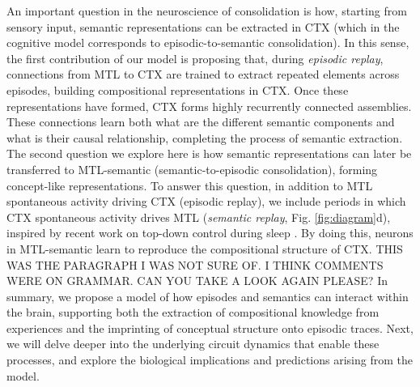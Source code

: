 \documentclass{article}
\begin{document}
\newline\newline
An important question in the neuroscience of consolidation is how, starting from sensory input, semantic representations can be extracted in CTX (which in the cognitive model corresponds to episodic-to-semantic consolidation). In this sense, the first contribution of our model is proposing that, during \textit{episodic replay}, connections from MTL to CTX are trained to extract repeated elements across episodes, building compositional representations in CTX. Once these representations have formed, CTX forms highly recurrently connected assemblies. These connections learn both what are the different semantic components and what is their causal relationship, completing the process of semantic extraction.
\newline\newline
The second question we explore here is how semantic representations can later be transferred to MTL-semantic (semantic-to-episodic consolidation), forming concept-like representations. To answer this question, in addition to MTL spontaneous activity driving CTX (episodic replay), we include periods in which CTX spontaneous activity drives MTL (\textit{semantic replay}, Fig. \ref{fig:diagram}d), inspired by recent work on top-down control during sleep . By doing this, neurons in MTL-semantic learn to reproduce the compositional structure of CTX. THIS WAS THE PARAGRAPH I WAS NOT SURE OF. I THINK COMMENTS WERE ON GRAMMAR. CAN YOU TAKE A LOOK AGAIN PLEASE?
\newline\newline
In summary, we propose a model of how episodes and semantics can interact within the brain, supporting both the extraction of compositional knowledge from experiences and the imprinting of conceptual structure onto episodic traces. Next, we will delve deeper into the underlying circuit dynamics that enable these processes, and explore the biological implications and predictions arising from the model.
\end{document}
